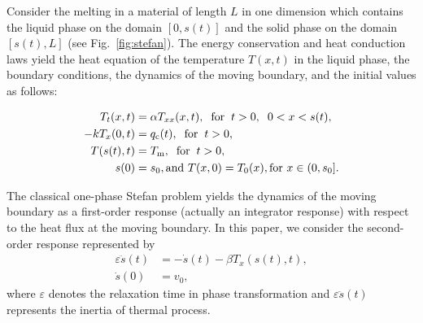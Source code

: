 \documentclass[letterpaper, 10 pt, conference]{cls/ieeeconf}
\theoremstyle{definition}
\newcommand{\ep}{\varepsilon}
\begin{document}
Consider the melting in a material of length $L$ in one dimension which contains the liquid phase on the domain $[0, s(t)]$ and the solid phase on the domain $[s(t), L]$ (see  Fig.~\ref{fig:stefan}). 
The energy conservation and heat conduction laws yield 
the heat equation of  the temperature $T(x,t)$ in the liquid phase, the boundary conditions, the dynamics of the moving boundary, and the initial values as follows:

\begin{align}\label{eq:stefanPDE}
T_t(x,t)&=\alpha T_{xx}(x,t), \hspace{2mm}  \textrm{for} \hspace{2mm} t > 0, \hspace{2mm} 0< x< s(t), \\ 
\label{eq:stefancontrol}
-k T_x(0,t)&=q_{\rm c}(t),  \hspace{2mm} \textrm{for} \hspace{2mm} t >0,\\ \label{eq:stefanBC}
T(s(t),t)&= T_{\rm m}, \hspace{2mm} \textrm{for} \hspace{2mm} t >0, \\
\label{eq:stefanIC}
 s(0) &=  s_0, \textrm{and } T(x,0) = T_0(x),  \textrm{for } x \in (0, s_0]. 
\end{align}

The classical one-phase Stefan problem yields the dynamics of the moving boundary as a first-order response (actually an integrator response) with respect to the heat flux at the moving boundary.
In this paper, we consider the second-order response represented by 
\begin{align}
\label{eq:stefanODE}
\ep \ddot s(t) & = - \dot s(t) - \beta T_x(s(t),t) , \\
\dot s(0) & = v_0, 
\end{align}
where $\ep$ denotes the relaxation time 
in phase transformation and $\ep \ddot s(t)$ represents the inertia of thermal process. 
\end{document}

